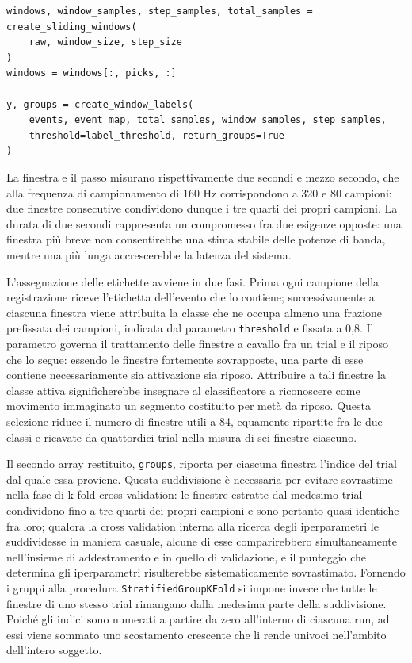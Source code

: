 \begin{lstlisting}
windows, window_samples, step_samples, total_samples = create_sliding_windows(
    raw, window_size, step_size
)
windows = windows[:, picks, :]

y, groups = create_window_labels(
    events, event_map, total_samples, window_samples, step_samples,
    threshold=label_threshold, return_groups=True
)
\end{lstlisting}

La finestra e il passo misurano rispettivamente due secondi e mezzo secondo, che alla frequenza di campionamento di 160 Hz corrispondono a 320 e 80 campioni: due finestre consecutive condividono dunque i tre quarti dei propri campioni. La durata di due secondi rappresenta un compromesso fra due esigenze opposte: una finestra più breve non consentirebbe una stima stabile delle potenze di banda, mentre una più lunga accrescerebbe la latenza del sistema. 

L’assegnazione delle etichette avviene in due fasi. Prima ogni campione della registrazione riceve l’etichetta dell’evento che lo contiene; successivamente a ciascuna finestra viene attribuita la classe che ne occupa almeno una frazione prefissata dei campioni, indicata dal parametro \texttt{threshold} e fissata a 0,8. Il parametro governa il trattamento delle finestre a cavallo fra un trial e il riposo che lo segue: essendo le finestre fortemente sovrapposte, una parte di esse contiene necessariamente sia attivazione sia riposo. Attribuire a tali finestre la classe attiva significherebbe insegnare al classificatore a riconoscere come movimento immaginato un segmento costituito per metà da riposo. Questa selezione riduce il numero di finestre utili a 84, equamente ripartite fra le due classi e ricavate da quattordici trial nella misura di sei finestre ciascuno.

Il secondo array restituito, \texttt{groups}, riporta per ciascuna finestra l’indice del trial dal quale essa proviene. Questa suddivisione è necessaria per evitare sovrastime nella fase di k-fold cross validation: le finestre estratte dal medesimo trial condividono fino a tre quarti dei propri campioni e sono pertanto quasi identiche fra loro; qualora la cross validation interna alla ricerca degli iperparametri le suddividesse in maniera casuale, alcune di esse comparirebbero simultaneamente nell’insieme di addestramento e in quello di validazione, e il punteggio che determina gli iperparametri risulterebbe sistematicamente sovrastimato. Fornendo i gruppi alla procedura \texttt{StratifiedGroupKFold} si impone invece che tutte le finestre di uno stesso trial rimangano dalla medesima parte della suddivisione. Poiché gli indici sono numerati a partire da zero all’interno di ciascuna run, ad essi viene sommato uno scostamento crescente che li rende univoci nell’ambito dell’intero soggetto.

